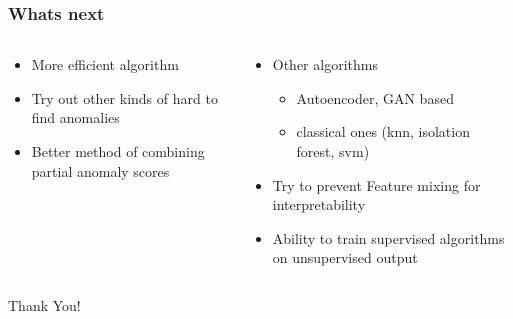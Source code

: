 \documentclass[hyperref={pdfpagelabels=false}]{beamer}
\begin{document}
\begin{frame}[label=Whats next]
\frametitle{Whats next}
\begin{columns}[c] %
\begin{column}{0.48\textwidth}%
\begin{itemize}

    \item More efficient algorithm

    \item Try out other kinds of hard to find anomalies

    \item Better method of combining partial anomaly scores


\end{itemize}
\end{column}%
\hfill%
\begin{column}{0.48\textwidth}%
\begin{itemize}

    \item Other algorithms

\begin{itemize}

    \item Autoencoder, GAN based

    \item classical ones (knn, isolation forest, svm)


\end{itemize}
    \item Try to prevent Feature mixing for interpretability

    \item Ability to train supervised algorithms on unsupervised output


\end{itemize}
\end{column}%
\hfill%
\end{columns}

\end{frame}



\begin{frame}[noframenumbering]%
\begin{center}
\Huge Thank You!
\end{center}
\end{frame}



\end{document}
